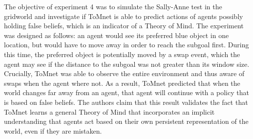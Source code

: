 \documentclass[twocolumn,superscriptaddress,aps]{revtex4-1}
\begin{document}
The objective of experiment 4 was to simulate the Sally-Anne test in the gridworld and investigate if ToMnet is able to predict actions of agents possibly holding false beliefs, which is an indicator of a Theory of Mind. The experiment was designed as follows: an agent would see its preferred blue object in one location, but would have to move away in order to reach the subgoal first. During this time, the preferred object is potentially moved by a swap event, which the agent may see if the distance to the subgoal was not greater than its window size. Crucially, ToMnet was able to observe the entire environment and thus aware of swaps when the agent where not. As a result, ToMnet predicted that when the world changes far away from an agent, that agent will continue with a policy that is based on false beliefs. The authors claim that this result validates the fact that ToMnet learns a general Theory of Mind that incorporates an implicit understanding that agents act based on their own persistent representation of the world, even if they are mistaken. \\
\end{document}
